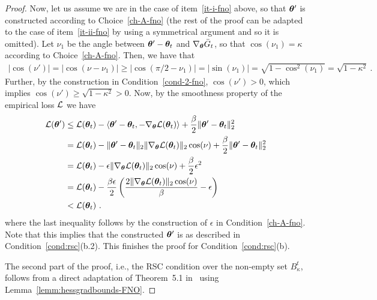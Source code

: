 \begin{proof}
%
Now, let us assume we are in the case of item~\eqref{it-i-fno} above, so that ${\bm{\theta}}'$ is constructed according to Choice~\eqref{ch-A-fno} (the rest of the proof can be adapted to the case of item~\eqref{it-ii-fno} by using a symmetrical argument and so it is omitted).  
Let $\nu_1$ be the angle between ${\bm{\theta}}'-{\bm{\theta}}_{t}$ and $\nabla_{\bm{\theta}}\bar{G}_t$, so that $\cos(\nu_1)=\kappa$ according to Choice~\eqref{ch-A-fno}.
%
Then, we have that 
\begin{align*}
|\cos(\nu')| = |\cos(\nu - \nu_1)| \geq |\cos(\pi/2 - \nu_1)| = |\sin(\nu_1)| = \sqrt{1-\cos^2(\nu_1)} = \sqrt{1-\kappa^2}~.
\end{align*}
Further, by the construction in Condition~\eqref{cond-2-fno}, $\cos(\nu') > 0$, which implies 
$\cos(\nu') \geq  \sqrt{1-\kappa^2}>0$.
%
Now, 
by the smoothness property of the empirical loss ${\cal L}$ we have
\begin{align*}
{\cal L}({\bm{\theta}}') & \leq {\cal L}({\bm{\theta}}_t) - \langle {\bm{\theta}}' - {\bm{\theta}}_t, -\nabla_{\bm{\theta}} {\cal L}({\bm{\theta}}_t) \rangle + \frac{\beta}{2}\| {\bm{\theta}}' - {\bm{\theta}}_t \|_2^2 \\ 
& = {\cal L}({\bm{\theta}}_t) - \|{\bm{\theta}}' - {\bm{\theta}}_{t}\|_2 \|\nabla_{{\bm{\theta}}} {\cal L}({\bm{\theta}}_t) \|_2 \cos(\nu) + \frac{\beta}{2}\| {\bm{\theta}}' - {\bm{\theta}}_{t} \|_2^2 \\
& =  {\cal L}({\bm{\theta}}_t) -  \epsilon \|\nabla_{{\bm{\theta}}} {\cal L}({\bm{\theta}}_t) \|_2 \cos(\nu) + \frac{\beta}{2} \epsilon^2 \\
& = {\cal L}({\bm{\theta}}_t) -  \frac{\beta \epsilon}{2} \left( \frac{2 \|\nabla_{{\bm{\theta}}} {\cal L}({\bm{\theta}}_t) \|_2 \cos(\nu)}{\beta} - \epsilon \right)\\
&<{\cal L}({\bm{\theta}}_t)~.
\end{align*}
where the last inequality follows by the construction of $\epsilon$ in Condition~\eqref{ch-A-fno}. Note that this implies that the constructed ${\bm{\theta}}'$ is as described in Condition~\ref{cond:rsc}(b.2). This finishes the proof for Condition~\ref{cond:rsc}(b).

The second part of the proof, i.e., the RSC condition over the non-empty set $B^t_{\kappa}$, %
follows from a direct adaptation of Theorem~5.1 in~\citep{banerjee2022restricted} using Lemma~\ref{lemm:hessgradbounds-FNO}.  
%
%
\end{proof}


